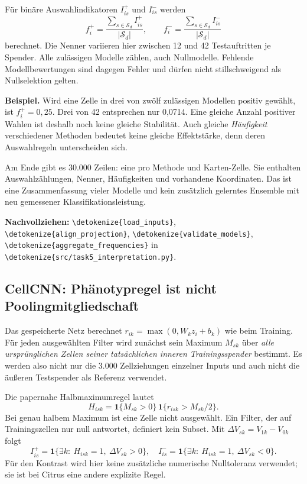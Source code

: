 \documentclass[11pt,a4paper]{article}
\newcommand{\code}[1]{\expandafter\nolinkurl\expandafter{\detokenize{#1}}}
\newcommand{\source}[1]{\par{\footnotesize\raggedright\color{muted}\textbf{Nachvollziehen:} #1\par}}
\begin{document}
Für binäre Auswahlindikatoren \(I_{is}^{+}\) und \(I_{is}^{-}\) werden
\[
 f_i^+=\frac{\sum_{s\in\mathcal S_d}I_{is}^+}{|\mathcal S_d|},\qquad
 f_i^-=\frac{\sum_{s\in\mathcal S_d}I_{is}^-}{|\mathcal S_d|}
\]
berechnet. Die Nenner variieren hier zwischen 12 und 42 Testauftritten
je Spender. Alle zulässigen Modelle zählen, auch Nullmodelle. Fehlende
Modellbewertungen sind dagegen Fehler und dürfen nicht stillschweigend
als Nullselektion gelten.

\textbf{Beispiel.} Wird eine Zelle in drei von zwölf zulässigen Modellen
positiv gewählt, ist \(f_i^+=0{,}25\). Drei von 42 entsprechen nur
0,0714. Eine gleiche Anzahl positiver Wahlen ist deshalb noch keine gleiche
Stabilität. Auch gleiche \emph{Häufigkeit} verschiedener Methoden bedeutet
keine gleiche Effektstärke, denn deren Auswahlregeln unterscheiden sich.

Am Ende gibt es 30.000 Zeilen: eine pro Methode und Karten-Zelle. Sie
enthalten Auswahlzählungen, Nenner, Häufigkeiten und vorhandene
Koordinaten. Das ist eine Zusammenfassung vieler Modelle und kein
zusätzlich gelerntes Ensemble mit neu gemessener Klassifikationsleistung.
\source{\code{load_inputs}, \code{align_projection}, \code{validate_models},
\code{aggregate_frequencies} in \code{src/task5_interpretation.py}.}

\clearpage
\subsection*{CellCNN: Phänotypregel ist nicht Poolingmitgliedschaft}
Das gespeicherte Netz berechnet \(r_{ik}=\max(0,W_kz_i+b_k)\) wie beim
Training. Für jeden ausgewählten Filter wird zunächst sein Maximum
\(M_{sk}\) über \emph{alle ursprünglichen Zellen seiner tatsächlichen
inneren Trainingsspender} bestimmt. Es werden also nicht nur die 3.000
Zellziehungen einzelner Inputs und auch nicht die äußeren Testspender
als Referenz verwendet.

Die papernahe Halbmaximumregel lautet
\[
 H_{isk}=\mathbf1\{M_{sk}>0\}\,
          \mathbf1\{r_{isk}>M_{sk}/2\}.
\]
Bei genau halbem Maximum ist eine Zelle nicht ausgewählt. Ein Filter,
der auf Trainingszellen nur null antwortet, definiert kein Subset.
Mit \(\Delta V_{sk}=V_{1k}-V_{0k}\) folgt
\[
 I_{is}^+=\mathbf1\{\exists k:\ H_{isk}=1,\ \Delta V_{sk}>0\},
 \quad
 I_{is}^-=\mathbf1\{\exists k:\ H_{isk}=1,\ \Delta V_{sk}<0\}.
\]
Für den Kontrast wird hier keine zusätzliche numerische Nulltoleranz
verwendet; sie ist bei Citrus eine andere explizite Regel.
\end{document}

